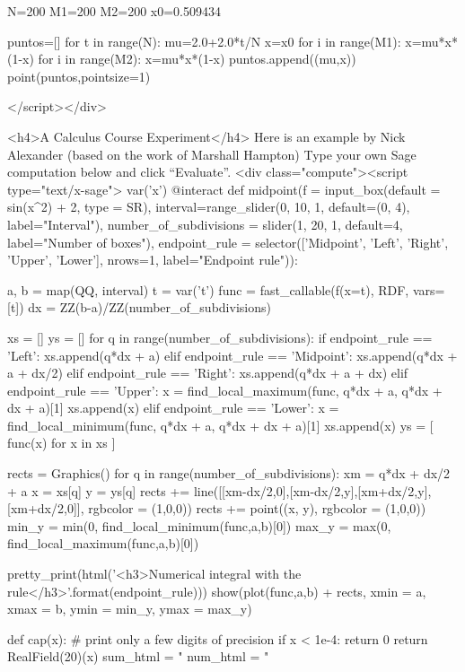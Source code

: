 \documentclass[11pt, oneside]{article}   	%
\begin{document}
\begin{html}
N=200
M1=200
M2=200
x0=0.509434

puntos=[]
for t in range(N):
   mu=2.0+2.0*t/N
   x=x0
   for i in range(M1):
       x=mu*x*(1-x)
   for i in range(M2):
       x=mu*x*(1-x)
       puntos.append((mu,x))
point(puntos,pointsize=1)

</script></div>

<h4>A Calculus Course Experiment</h4>
Here is an example by Nick Alexander (based on the work of Marshall Hampton)
Type your own Sage computation below and click “Evaluate”.
    <div class="compute"><script type="text/x-sage">
var('x')
@interact
def midpoint(f = input_box(default = sin(x^2) + 2, type = SR),
    interval=range_slider(0, 10, 1, default=(0, 4), label="Interval"),
    number_of_subdivisions = slider(1, 20, 1, default=4, label="Number of boxes"),
    endpoint_rule = selector(['Midpoint', 'Left', 'Right', 'Upper', 'Lower'], nrows=1, label="Endpoint rule")):

    a, b = map(QQ, interval)
    t = var('t')
    func = fast_callable(f(x=t), RDF, vars=[t])
    dx = ZZ(b-a)/ZZ(number_of_subdivisions)
   
    xs = []
    ys = []
    for q in range(number_of_subdivisions):
        if endpoint_rule == 'Left':
            xs.append(q*dx + a)
        elif endpoint_rule == 'Midpoint':
            xs.append(q*dx + a + dx/2)
        elif endpoint_rule == 'Right':
            xs.append(q*dx + a + dx)
        elif endpoint_rule == 'Upper':
            x = find_local_maximum(func, q*dx + a, q*dx + dx + a)[1]
            xs.append(x)
        elif endpoint_rule == 'Lower':
            x = find_local_minimum(func, q*dx + a, q*dx + dx + a)[1]
            xs.append(x)
    ys = [ func(x) for x in xs ]
         
    rects = Graphics()
    for q in range(number_of_subdivisions):
        xm = q*dx + dx/2 + a
        x = xs[q]
        y = ys[q]
        rects += line([[xm-dx/2,0],[xm-dx/2,y],[xm+dx/2,y],[xm+dx/2,0]], rgbcolor = (1,0,0))
        rects += point((x, y), rgbcolor = (1,0,0))
    min_y = min(0, find_local_minimum(func,a,b)[0])
    max_y = max(0, find_local_maximum(func,a,b)[0])

    pretty_print(html('<h3>Numerical integral with the {} rule</h3>'.format(endpoint_rule)))
    show(plot(func,a,b) + rects, xmin = a, xmax = b, ymin = min_y, ymax = max_y)
    
    def cap(x):
        # print only a few digits of precision
        if x < 1e-4:
            return 0
        return RealField(20)(x)
    sum_html = "%
    num_html = "%
    

\end{html}
\end{document}
